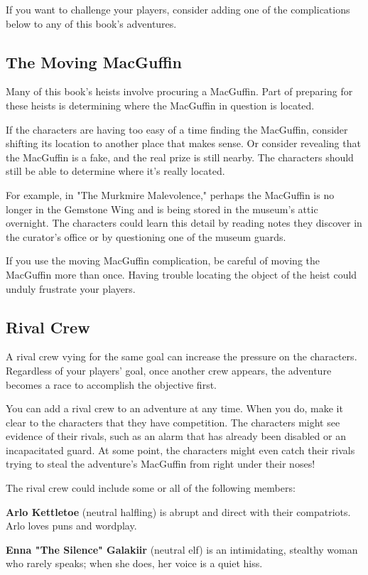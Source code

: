 \documentclass[10pt,a4paper,twoside,bg=print,twocolumn,openany,nodeprecatedcode]{dndbook}
\begin{document}
If you want to challenge your players, consider adding one of the complications below to any of this book's adventures.

\subsection{The Moving MacGuffin}
Many of this book's heists involve procuring a MacGuffin. Part of preparing for these heists is determining where the MacGuffin in question is located.

If the characters are having too easy of a time finding the MacGuffin, consider shifting its location to another place that makes sense. Or consider revealing that the MacGuffin is a fake, and the real prize is still nearby. The characters should still be able to determine where it's really located.

For example, in "The Murkmire Malevolence," perhaps the MacGuffin is no longer in the Gemstone Wing and is being stored in the museum's attic overnight. The characters could learn this detail by reading notes they discover in the curator's office or by questioning one of the museum guards.

If you use the moving MacGuffin complication, be careful of moving the MacGuffin more than once. Having trouble locating the object of the heist could unduly frustrate your players.

\subsection{Rival Crew}
A rival crew vying for the same goal can increase the pressure on the characters. Regardless of your players' goal, once another crew appears, the adventure becomes a race to accomplish the objective first.

You can add a rival crew to an adventure at any time. When you do, make it clear to the characters that they have competition. The characters might see evidence of their rivals, such as an alarm that has already been disabled or an incapacitated guard. At some point, the characters might even catch their rivals trying to steal the adventure's MacGuffin from right under their noses!

The rival crew could include some or all of the following members:

\textbf{Arlo Kettletoe} (neutral halfling) is abrupt and direct with their compatriots. Arlo loves puns and wordplay.

\textbf{Enna "The Silence" Galakiir} (neutral elf) is an intimidating, stealthy woman who rarely speaks; when she does, her voice is a quiet hiss.
\end{document}
